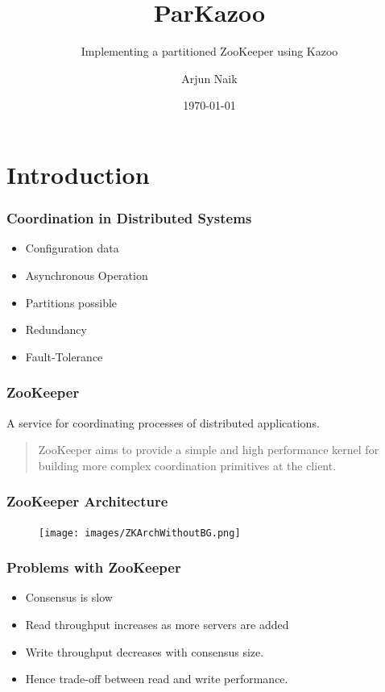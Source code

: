 \documentclass[10pt, compress]{beamer}
\title{ParKazoo}
\subtitle{Implementing a partitioned ZooKeeper using Kazoo}
\date{\today}
\author{Arjun Naik}
\institute{TU Dresden}
\begin{document}
\maketitle

\section{Introduction}

\begin{frame}[fragile]
    \frametitle{Coordination in Distributed Systems}
    \begin{itemize}
        \item Configuration data
        \item Asynchronous Operation
        \item Partitions possible
        \item Redundancy
        \item Fault-Tolerance
    \end{itemize}
\end{frame}

\begin{frame}[fragile]
    \frametitle{ZooKeeper}
    A service for coordinating processes of distributed applications.
    \begin{quote}
        ZooKeeper aims to provide a simple and high performance kernel for building more complex
        coordination primitives at the client. 
    \end{quote}
\end{frame}

\begin{frame}[fragile]
    \frametitle{ZooKeeper Architecture}
    \begin{figure}[ht!]
        \centering
        \texttt{[image: images/ZKArchWithoutBG.png]}
    \end{figure}
\end{frame}

\begin{frame}
    \frametitle{Problems with ZooKeeper}
    \begin{itemize}
        \item Consensus is slow
        \item Read throughput increases as more servers are added
        \item Write throughput decreases with consensus size.
        \item Hence trade-off between read and write performance.
    \end{itemize}
\end{frame}
\end{document}
